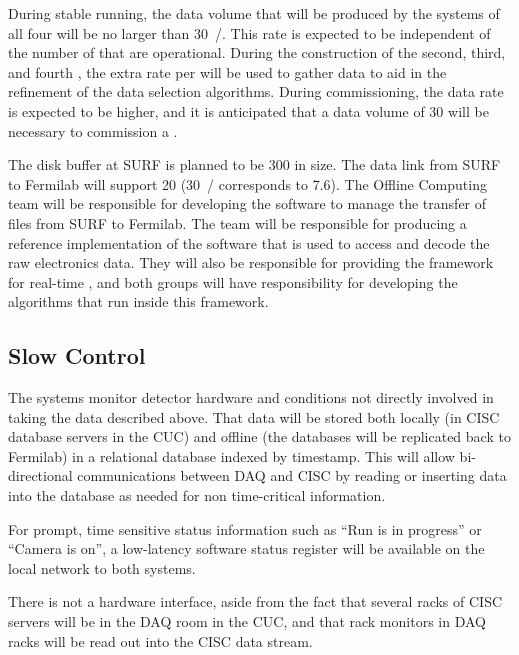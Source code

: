During stable running, the data volume that will be produced by the
 systems of all four  will be no larger
than \SI{30}{\PB/\year}.
This rate is expected to be independent of the number of
 that are operational.
During the construction of the second, third, and fourth
, the extra rate per  will be used
to gather data to aid in the refinement of the data selection
algorithms.
During commissioning, the data rate is expected to be higher, and it
is anticipated that a data volume of \SI{30}{\PB} will be necessary to
commission a .

The disk buffer at SURF is planned to be \SI{300}{\TB} in size.
The data link from SURF to Fermilab will support \SI{20}{\Gbps}
(\SI{30}{\PB/\year} corresponds to \SI{7.6}{\Gbps}).
The Offline Computing team will be responsible for developing the
software to manage the transfer of files from SURF to Fermilab.
The  team will be responsible for producing a reference
implementation of the software that is used to access and decode the
raw electronics data.
They will also be responsible for providing the framework for
real-time , and both groups will have responsibility for
developing the  algorithms that run inside this framework.

\subsection{Slow Control}
\label{sec:fd-daq-intfc-sc}
\label{sec:fd-daq-intfc-sc}

The  systems monitor detector hardware and conditions not
directly involved in taking the data described above.
That data will be stored both locally (in CISC database servers in the
CUC) and offline (the databases will be replicated back to Fermilab)
in a relational database indexed by timestamp.
This will allow bi-directional communications between DAQ and CISC by
reading or inserting data into the database as needed for non
time-critical information.  

For prompt, time sensitive status information such as ``Run is in
progress'' or ``Camera is on'', a low-latency software status register
will be available on the local network to both systems.

There is not a hardware interface, aside from the fact that several
racks of CISC servers will be in the DAQ room in the CUC, and that rack
monitors in DAQ racks will be read out into the CISC data stream.


